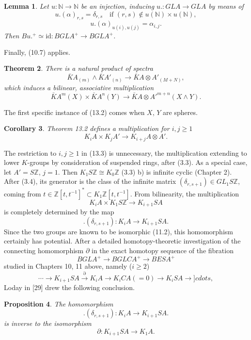 \documentclass[openany,leqno]{book}  %
\newcommand{\id}{\mathrm{id}} %
\newcommand{\N}{\mathbb{N}}
\newcommand{\Z}{\mathbb{Z}}
\newtheorem{theorem}{Theorem}[chapter]
\newtheorem{lemma}[theorem]{Lemma}
\newtheorem{prop}[theorem]{Proposition}
\newtheorem{corollary}[theorem]{Corollary}
\begin{document}
\begin{lemma}
  Let $u \colon  \N\longrightarrow \N$ be an injection, inducing $u. \colon  GLA\longrightarrow GLA$ by means of
  \[u.(\alpha)_{r,s} = \delta_{r,s} \quad \mbox{if } (r, s) \notin u(\N) \times u(\N),\]
  \[u.(\alpha)_{u(i),u(j)} = \alpha_{i,j}.\]
Then $Bu.^+ \simeq \id \colon  BGLA^+ \longrightarrow BGLA^+ $.
\end{lemma}
Finally, (10.7) applies.
\begin{theorem}
  There is a natural product of spectra
  \[\bar{K}A_{(m)}\wedge \bar{K}A'_{(n)} \longrightarrow \bar{K}A \otimes A'_{(M+N)},\]
which induces a bilinear, associative multiplication
\[\bar{K}A^m(X) \times \bar{K}A^n(Y) \longrightarrow \bar{K}A \otimes {A'}^{m+n}(X \wedge Y).\]
\end{theorem}
The first specific instance of (13.2) comes when $X$, $Y$ are spheres.
\begin{corollary}
  Theorem 13.2 defines a multiplication for $i,j\geqslant 1$
  \[K_iA \times K_jA'\longrightarrow K_{i+j}A\otimes A'.\]
\end{corollary}
The restriction to $i, j \geqslant 1$ in (13.3) is unnecessary, the multiplication extending to lower $K$-groups by consideration of suspended rings, after (3.3). As a special case, let $A' = S\Z$, $j = 1$. Then $K_1 S\Z \cong K_0\Z$ (3.3) b) is infinite cyclic (Chapter 2). After (3.4), its generator is the class of the infinite matrix $(\delta_{r ,s+1}) \in GL_1 S\Z$, coming from $t \in \Z[t, t^{-1}]^* \subset K_1 \Z[t, t^{-1}]$. From bilinearity, the multiplication
\[K_i A\times K_1S\Z\longrightarrow K_{i+1}SA\]
is completely determined by the map
\[.(\delta_{r,s+1})\colon K_i A\longrightarrow K_{i+1}SA.\]
Since the two groups are known to be isomorphic (11.2), this homomorphism certainly has potential. After a detailed homotopy-theoretic investigation of the connecting homomorphism $\partial$ in the exact homotopy sequence of the fibration
\[BGLA^+ \longrightarrow BGLCA^+ \longrightarrow BESA^+\]
studied in Chapters 10, 11 above, namely ($i \geqslant 2$)
\[\cdots \longrightarrow K_{i+1}SA \overset{\partial}{\longrightarrow} K_iA \longrightarrow K_iCA (= 0) \longrightarrow K_iSA \longrightarrow ]cdots ,\]
Loday in [29] drew the following conclusion.
\begin{prop}
  The homomorphism
  \[.(\delta_{r,s+1})\colon  K_i A\longrightarrow K_{i+1}SA.\]
is inverse to the isomorphism
\[\partial\colon K_{i+1}SA \longrightarrow K_1 A.\]
\end{prop}
\end{document}
